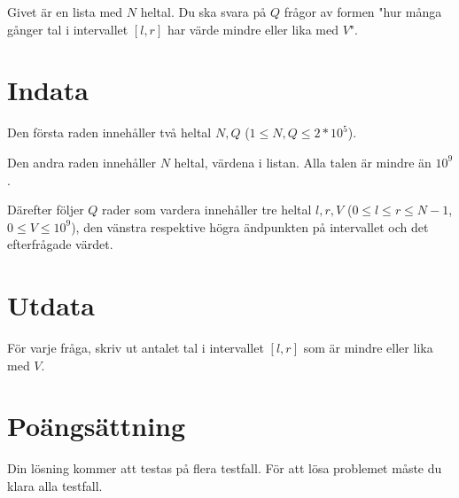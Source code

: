 Givet är en lista med $N$ heltal. Du ska svara på $Q$ frågor av formen "hur många gånger tal
i intervallet $[l,r]$ har värde mindre eller lika med $V$".

\section*{Indata}
Den första raden innehåller två heltal $N,Q$ ($1 \leq N,Q \leq 2*10^5$).

Den andra raden innehåller $N$ heltal, värdena i listan. Alla talen är mindre än $10^9$.

Därefter följer $Q$ rader som vardera innehåller tre heltal $l, r, V$ ($0 \leq l \leq r \leq N-1$, $0 \leq V \leq 10^9$),
den vänstra respektive högra ändpunkten på intervallet och det efterfrågade värdet.

\section*{Utdata}
För varje fråga, skriv ut antalet tal i intervallet $[l,r]$ som är mindre eller lika med $V$.

\section*{Poängsättning}
Din lösning kommer att testas på flera testfall.
\noindent
För att lösa problemet måste du klara alla testfall.
